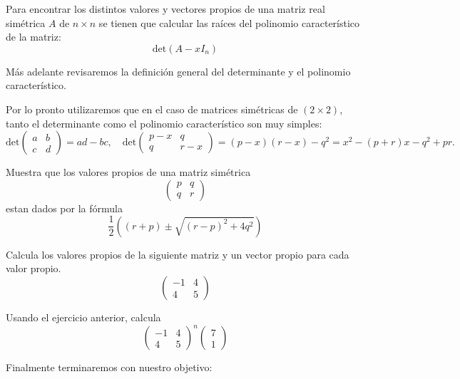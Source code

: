 Para encontrar los distintos valores y vectores propios de una matriz real simétrica $A$ de $n\times n$ se tienen que calcular las raíces del polinomio característico de la matriz: 
$$\mathrm{det}(A-xI_n)$$

Más adelante revisaremos la definición general del determinante y el polinomio característico.
\newpage

Por lo pronto utilizaremos que en el caso de matrices simétricas de $(2\times 2)$, tanto el determinante como el polinomio característico son muy simples: $$\mathrm{det}
\left(\begin{array}{cc}
a&b \\
c&d 
\end{array}\right)=ad-bc,
\quad
\mathrm{det}
\left(\begin{array}{cc}
p-x&q \\
q&r-x 
\end{array}\right)
=
(p-x)(r-x)-q^2
=x^2-(p+r)x-q^2+pr.
$$

\begin{ejercicio}
Muestra que los valores propios de una matriz simétrica 
$$
\left(\begin{array}{cc}
p&q \\
q&r 
\end{array}\right)
$$
estan dados por la fórmula $$\frac{1}{2}((r+p)\pm \sqrt{(r-p)^2+4q^2})$$
\end{ejercicio}

\begin{ejercicio}
Calcula los valores propios de la siguiente matriz y un vector propio para cada valor propio.
$$
\left(\begin{array}{cc}
-1&4 \\
4&5 
\end{array}\right)
$$
\end{ejercicio}
\vspace{2cm}

\begin{ejercicio}
Usando el ejercicio anterior, calcula
$$
\left(\begin{array}{cc}
-1&4 \\
4&5 
\end{array}\right)^n
\left(\begin{array}{c}
7 \\
1 
\end{array}\right)
$$
\end{ejercicio}

Finalmente terminaremos con nuestro objetivo:

